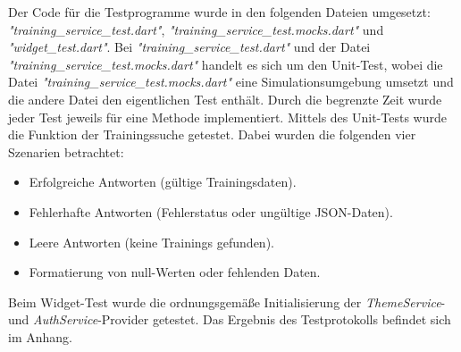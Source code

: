 Der Code für die Testprogramme wurde in den folgenden Dateien umgesetzt: \textit{"training\_service\_test.dart"}, \textit{"training\_service\_test.mocks.dart"} und \textit{"widget\_test.dart"}.
Bei \textit{"training\_service\_test.dart"} und der Datei \textit{"training\_service\_test.mocks.dart"} handelt es sich
um den Unit-Test, wobei die Datei \textit{"training\_service\_test.mocks.dart"} eine Simulationsumgebung umsetzt und die andere Datei
 den eigentlichen Test enthält.
Durch die begrenzte Zeit wurde jeder Test jeweils für eine Methode implementiert. Mittels des Unit-Tests wurde die Funktion der
 Trainingssuche getestet. Dabei wurden die folgenden vier Szenarien betrachtet:
\begin{itemize}
    \item Erfolgreiche Antworten (gültige Trainingsdaten).
    \item Fehlerhafte Antworten (Fehlerstatus oder ungültige JSON-Daten).
    \item Leere Antworten (keine Trainings gefunden).
    \item Formatierung von null-Werten oder fehlenden Daten.
\end{itemize}

Beim Widget-Test wurde die ordnungsgemäße Initialisierung der \textit{ThemeService}- und \textit{AuthService}-Provider getestet. 
Das Ergebnis des Testprotokolls befindet sich im Anhang.
